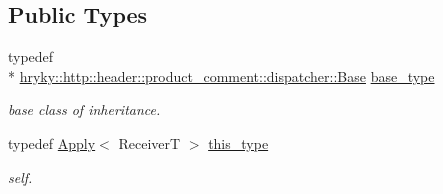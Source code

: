 \subsection*{Public Types}
\begin{DoxyCompactItemize}
\item 
\hypertarget{classhryky_1_1http_1_1header_1_1product__comment_1_1dispatcher_1_1_apply_afd54b194ccb0eedbaf6dcc6663b8b34b}{typedef \\*
\hyperlink{classhryky_1_1http_1_1header_1_1product__comment_1_1dispatcher_1_1_base}{hryky\-::http\-::header\-::product\-\_\-comment\-::dispatcher\-::\-Base} \hyperlink{classhryky_1_1http_1_1header_1_1product__comment_1_1dispatcher_1_1_apply_afd54b194ccb0eedbaf6dcc6663b8b34b}{base\-\_\-type}}\label{classhryky_1_1http_1_1header_1_1product__comment_1_1dispatcher_1_1_apply_afd54b194ccb0eedbaf6dcc6663b8b34b}

\begin{DoxyCompactList}\small\item\em base class of inheritance. \end{DoxyCompactList}\item 
\hypertarget{classhryky_1_1http_1_1header_1_1product__comment_1_1dispatcher_1_1_apply_a9e25411615673baf2c551497375a509e}{typedef \hyperlink{classhryky_1_1http_1_1header_1_1product__comment_1_1dispatcher_1_1_apply}{Apply}$<$ Receiver\-T $>$ \hyperlink{classhryky_1_1http_1_1header_1_1product__comment_1_1dispatcher_1_1_apply_a9e25411615673baf2c551497375a509e}{this\-\_\-type}}\label{classhryky_1_1http_1_1header_1_1product__comment_1_1dispatcher_1_1_apply_a9e25411615673baf2c551497375a509e}

\begin{DoxyCompactList}\small\item\em self. \end{DoxyCompactList}\end{DoxyCompactItemize}
